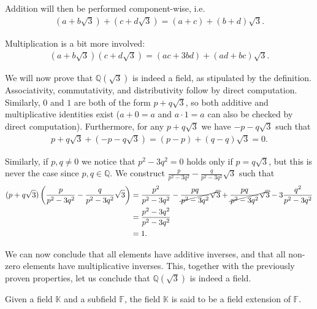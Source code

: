\begin{exmp}
  Addition will then be performed component-wise, i.e. 
  \begin{align*}
  (a + b \sqrt 3) + (c + d \sqrt 3) = (a + c)  + (b + d) \sqrt 3.
  \end{align*}

  Multiplication is a bit more involved:
  \begin{align*}
    (a + b \sqrt 3)(c + d \sqrt 3) = (ac + 3bd) + (ad + bc) \sqrt 3.
  \end{align*}

  We will now prove that $ \mathbb{Q}(\sqrt{3})$ is indeed a field, as stipulated by the definition. Associativity,  commutativity, and distributivity follow by direct computation. Similarly, $0$ and $1$ are both of the form $p + q \sqrt 3$, so both additive and multiplicative identities exist ($a + 0 = a$ and $a \cdot 1 = a$ can also be checked by direct computation). Furthermore, for any $p + q \sqrt 3$ we have $-p -q \sqrt 3$ such that 
  \begin{align*}
    p + q\sqrt 3 + (- p - q\sqrt 3) = (p - p) + (q - q) \sqrt 3 = 0.
  \end{align*}

  Similarly, if $p, q \neq 0$ we notice that $p ^2 - 3 q ^2 = 0$ holds only if $p = q \sqrt 3$, but this is never the case since $p, q \in \mathbb{Q}$. We construct $\frac p {p ^2 - 3 q ^2 } - \frac q {p ^2 - 3 q ^2 } \sqrt 3$ such that
  \begin{align*}
    (p + q \sqrt 3)\left(\frac p {p ^2 - 3 q ^2 } - \frac q {p ^2 - 3 q ^2 } \sqrt 3\right)
    &= \frac {p ^2}  {p ^2 - 3 q ^2 } - \cancel{\frac {pq} {p ^2 - 3 q ^2 } \sqrt 3}
    + \cancel{\frac {pq}  {p ^2 - 3 q ^2 } \sqrt 3} - 3\frac {q ^2 } {p ^2 - 3 q ^2 }
    \\&= \frac{p ^2 - 3 q ^2 }{p ^2 - 3 q ^2 }
    \\&= 1.
  \end{align*}

  We can now conclude that all elements have additive inverses, and that all non-zero elements have multiplicative inverses. This, together with the previously proven properties, let us conclude that $\mathbb{Q} (\sqrt{3})$ is indeed a field.
\end{exmp}

\begin{defn}
 Given a field $\mathbb{K}$ and a subfield $\mathbb{F}$, the field $\mathbb{K}$ is said to be a field extension of $\mathbb{F}$.
\end{defn}

